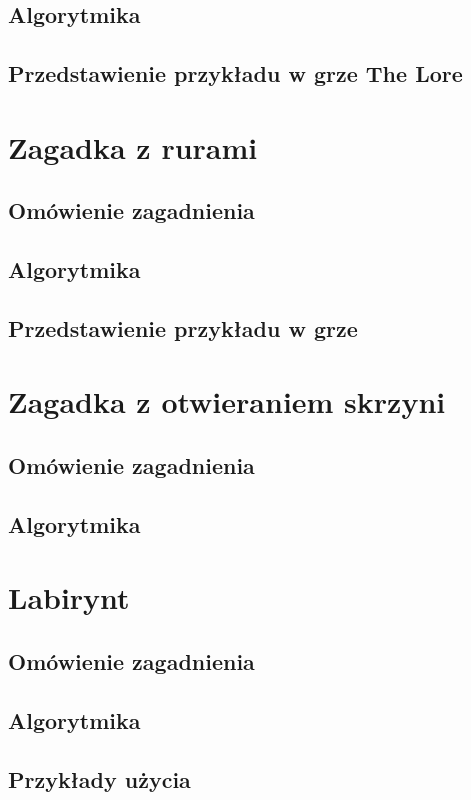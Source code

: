 \documentclass[oneside,polski,logo]{amuthesis}
\begin{document}
\subsection{Algorytmika}
\subsection{Przedstawienie przykładu w grze The Lore}

\section{Zagadka z rurami}
\subsection{Omówienie zagadnienia}
\subsection{Algorytmika}
\subsection{Przedstawienie przykładu w grze}

\section{Zagadka z otwieraniem skrzyni}
\subsection{Omówienie zagadnienia}
\subsection{Algorytmika}

\section{Labirynt}
\subsection{Omówienie zagadnienia}
\subsection{Algorytmika}
\subsection{Przykłady użycia}
\end{document}
